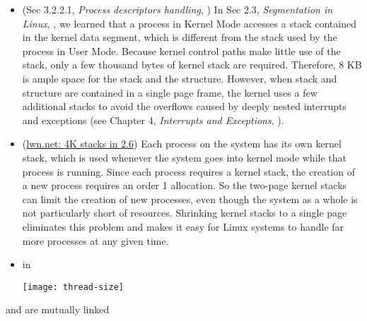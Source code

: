 \begin{itemize}
\begin{itemize}
  \item (Sec 3.2.2.1, \emph{Process descriptors handling}, \cite{bovet2005understanding})
    In Sec 2.3, \emph{Segmentation in Linux}, \cite{bovet2005understanding}, we learned
    that a process in Kernel Mode accesses a stack contained in the kernel data segment,
    which is different from the stack used by the process in User Mode. Because kernel
    control paths make little use of the stack, only a few thousand bytes of kernel stack
    are required. Therefore, 8 KB is ample space for the stack and the 
    structure. However, when stack and  structure are contained in a
    single page frame, the kernel uses a few additional stacks to avoid the overflows
    caused by deeply nested interrupts and exceptions (see Chapter 4, \emph{Interrupts and
      Exceptions}, \cite{bovet2005understanding}).
  \item (\href{http://lwn.net/Articles/84583/}{lwn.net: 4K stacks in 2.6})
     Each process on
    the system has its own kernel stack, which is used whenever the system goes into
    kernel mode while that process is running. Since each process requires a kernel stack,
    the creation of a new process requires an order 1 allocation. So the two-page kernel
    stacks can limit the creation of new processes, even though the system as a whole is
    not particularly short of resources. Shrinking kernel stacks to a single page
    eliminates this problem and makes it easy for Linux systems to handle far more
    processes at any given time.
  \item in 
    \begin{center}
      \texttt{[image: thread-size]}
    \end{center}
  \end{itemize}
\end{itemize}

\begin{frame}
  \begin{block}{ and  are mutually linked}
    \begin{center}
    \end{center}
  \end{block}
\end{frame}

